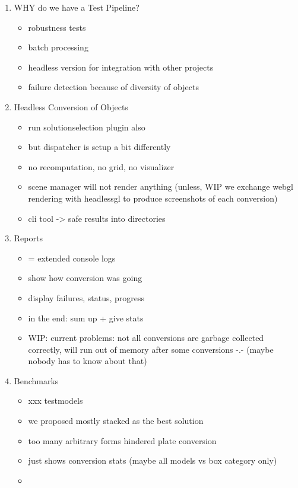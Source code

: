 \documentclass[../ClassicThesis.tex]{subfiles}
\begin{document}
\begin{enumerate}
\item WHY do we have a Test Pipeline?
  \begin{itemize}
  \item robustness tests
  \item batch processing
  \item headless version for integration with other projects
  \item failure detection because of diversity of objects
  \end{itemize}

\item Headless Conversion of Objects
  \begin{itemize}
  \item run solutionselection plugin also
  \item but dispatcher is setup a bit differently
  \item no recomputation, no grid, no visualizer
  \item scene manager will not render anything (unless, WIP we exchange webgl
    rendering with headlessgl to produce screenshots of each conversion)
  \item cli tool -> safe results into directories
  \end{itemize}

\item Reports
  \begin{itemize}
  \item = extended console logs
  \item show how conversion was going
  \item display failures, status, progress
  \item in the end: sum up + give stats
  \item WIP: current problems: not all conversions are garbage collected
    correctly, will run out of memory after some conversions -.- (maybe nobody
    has to know about that)
  \end{itemize}

\item Benchmarks
  \begin{itemize}
  \item xxx testmodels
  \item we proposed mostly stacked as the best solution
  \item too many arbitrary forms hindered plate conversion
  \item just shows conversion stats (maybe all models vs box category only)
  \item {}
  \end{itemize}
\end{enumerate}
\end{document}
